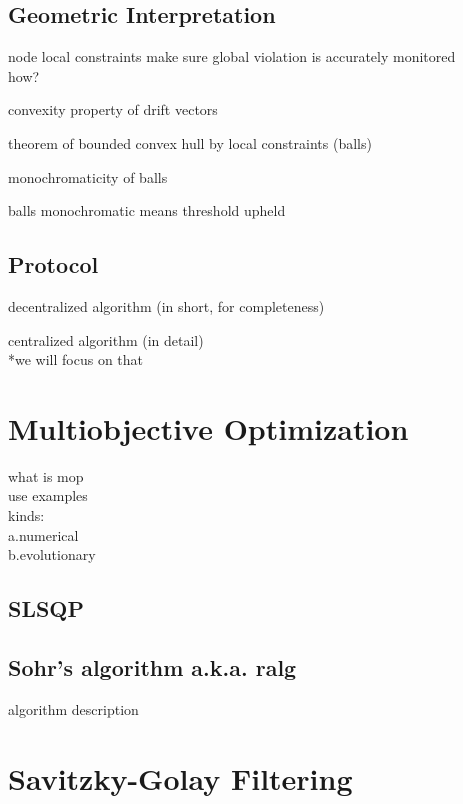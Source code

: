 \subsection{Geometric Interpretation} \label{subsec:theorBack-GM-geomInt}

node local constraints make sure global violation is accurately monitored\\
how?

convexity property of drift vectors

theorem of bounded convex hull by local constraints (balls)

monochromaticity of balls

balls monochromatic means threshold upheld


\subsection{Protocol} \label{subsec:theorBack-GM-protocol}

decentralized algorithm (in short, for completeness)

centralized algorithm (in detail)\\
*we will focus on that


\section{Multiobjective Optimization} \label{sec:theorBack-MOP}

what is mop\\
use examples\\
kinds:\\
	a.numerical\\
	b.evolutionary
\subsection{SLSQP} \label{subsec:theorBack-SLSQP}

\subsection{Sohr's algorithm a.k.a. ralg} \label{subsec:theorBack-CONMIN}

algorithm description

\section{Savitzky-Golay Filtering} \label{sec:theorBack-SavitzkyGolay}


